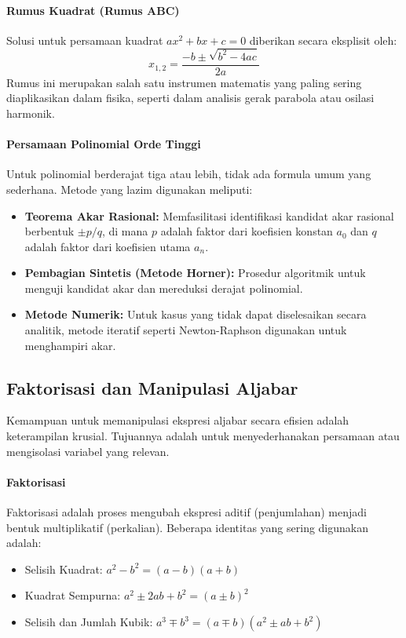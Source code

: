 \documentclass[12pt, a4paper]{article}
\begin{document}
\paragraph{Rumus Kuadrat (Rumus ABC)}
Solusi untuk persamaan kuadrat $ax^2 + bx + c = 0$ diberikan secara eksplisit oleh:
\[
x_{1,2} = \frac{-b \pm \sqrt{b^2 - 4ac}}{2a}
\]
Rumus ini merupakan salah satu instrumen matematis yang paling sering diaplikasikan dalam fisika, seperti dalam analisis gerak parabola atau osilasi harmonik.

\paragraph{Persamaan Polinomial Orde Tinggi}
Untuk polinomial berderajat tiga atau lebih, tidak ada formula umum yang sederhana. Metode yang lazim digunakan meliputi:
\begin{itemize}
    \item \textbf{Teorema Akar Rasional:} Memfasilitasi identifikasi kandidat akar rasional berbentuk $\pm p/q$, di mana $p$ adalah faktor dari koefisien konstan $a_0$ dan $q$ adalah faktor dari koefisien utama $a_n$.
    \item \textbf{Pembagian Sintetis (Metode Horner):} Prosedur algoritmik untuk menguji kandidat akar dan mereduksi derajat polinomial.
    \item \textbf{Metode Numerik:} Untuk kasus yang tidak dapat diselesaikan secara analitik, metode iteratif seperti Newton-Raphson digunakan untuk menghampiri akar.
\end{itemize}

\subsection{Faktorisasi dan Manipulasi Aljabar}
Kemampuan untuk memanipulasi ekspresi aljabar secara efisien adalah keterampilan krusial. Tujuannya adalah untuk menyederhanakan persamaan atau mengisolasi variabel yang relevan.

\paragraph{Faktorisasi}
Faktorisasi adalah proses mengubah ekspresi aditif (penjumlahan) menjadi bentuk multiplikatif (perkalian). Beberapa identitas yang sering digunakan adalah:
\begin{itemize}
    \item Selisih Kuadrat: $a^2 - b^2 = (a-b)(a+b)$
    \item Kuadrat Sempurna: $a^2 \pm 2ab + b^2 = (a \pm b)^2$
    \item Selisih dan Jumlah Kubik: $a^3 \mp b^3 = (a \mp b)(a^2 \pm ab + b^2)$
\end{itemize}
\end{document}

